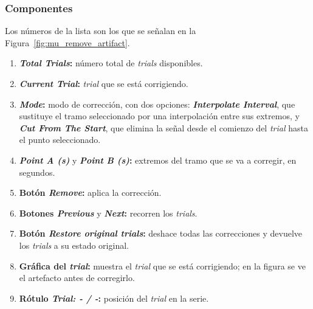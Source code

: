 \documentclass[11pt,a4paper]{article}
\begin{document}
    \subsubsection*{Componentes}
    Los n\'umeros de la lista son los que se se\~nalan en la Figura~\ref{fig:mu_remove_artifact}.
    \begin{enumerate}[label=(\arabic*)]
        \item \textbf{\textit{Total Trials}:} n\'umero total de \textit{trials} disponibles.
        \item \textbf{\textit{Current Trial}:} \textit{trial} que se est\'a corrigiendo.
        \item \textbf{\textit{Mode}:} modo de correcci\'on, con dos opciones: \textbf{\textit{Interpolate Interval}}, que sustituye el tramo seleccionado por una interpolaci\'on entre sus extremos, y \textbf{\textit{Cut From The Start}}, que elimina la se\~nal desde el comienzo del \textit{trial} hasta el punto seleccionado.
        \item \textbf{\textit{Point A (s)}} y \textbf{\textit{Point B (s)}:} extremos del tramo que se va a corregir, en segundos.
        \item \textbf{Bot\'on \textit{Remove}:} aplica la correcci\'on.
        \item \textbf{Botones \textit{Previous}} y \textbf{\textit{Next}:} recorren los \textit{trials}.
        \item \textbf{Bot\'on \textit{Restore original trials}:} deshace todas las correcciones y devuelve los \textit{trials} a su estado original.
        \item \textbf{Gr\'afica del \textit{trial}:} muestra el \textit{trial} que se est\'a corrigiendo; en la figura se ve el artefacto antes de corregirlo.
        \item \textbf{R\'otulo \textit{Trial: - / -}:} posici\'on del \textit{trial} en la serie.
    \end{enumerate}
\end{document}
